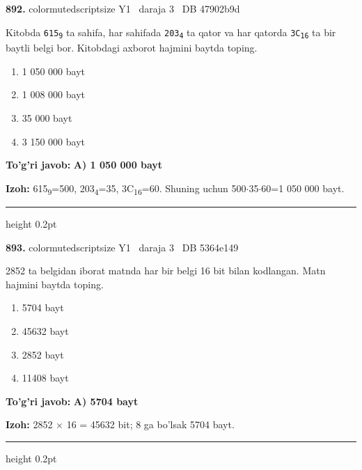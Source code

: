 \documentclass[10pt,a4paper,oneside]{article}
\begin{document}
\noindent\textbf{\color{ink}892.}  {color{muted}scriptsize Y1 \textbullet\ daraja 3 \textbullet\ DB 47902b9d}
\par
Kitobda \texttt{615\textsubscript{9}} ta sahifa, har sahifada \texttt{203\textsubscript{4}} ta qator va har qatorda \texttt{3C\textsubscript{1}\textsubscript{6}} ta bir baytli belgi bor. Kitobdagi axborot hajmini baytda toping.
\begin{enumerate}[label=\Alph*),leftmargin=9mm]
\item 1 050 000 bayt
\item 1 008 000 bayt
\item 35 000 bayt
\item 3 150 000 bayt
\end{enumerate}
\begin{tcolorbox}[enhanced,breakable,colback=teal!4,colframe=teal!50!black,boxrule=0.5pt,arc=1.1mm,left=3mm,right=3mm,top=1.7mm,bottom=1.7mm,before skip=2mm,after skip=2mm]
\textbf{\color{teal}To'g'ri javob:} \textbf{A) 1 050 000 bayt}
\par\smallskip
\textbf{Izoh:} 615\textsubscript{9}=500, 203\textsubscript{4}=35, 3C\textsubscript{1}\textsubscript{6}=60. Shuning uchun 500\ensuremath{\cdot}35\ensuremath{\cdot}60=1 050 000 bayt.
\end{tcolorbox}
\vspace{2mm}\hrule height 0.2pt \vspace{3mm}

\noindent\textbf{\color{ink}893.}  {color{muted}scriptsize Y1 \textbullet\ daraja 3 \textbullet\ DB 5364e149}
\par
2852 ta belgidan iborat matnda har bir belgi 16 bit bilan kodlangan. Matn hajmini baytda toping.
\begin{enumerate}[label=\Alph*),leftmargin=9mm]
\item 5704 bayt
\item 45632 bayt
\item 2852 bayt
\item 11408 bayt
\end{enumerate}
\begin{tcolorbox}[enhanced,breakable,colback=teal!4,colframe=teal!50!black,boxrule=0.5pt,arc=1.1mm,left=3mm,right=3mm,top=1.7mm,bottom=1.7mm,before skip=2mm,after skip=2mm]
\textbf{\color{teal}To'g'ri javob:} \textbf{A) 5704 bayt}
\par\smallskip
\textbf{Izoh:} 2852 \ensuremath{\times} 16 = 45632 bit; 8 ga bo'lsak 5704 bayt.
\end{tcolorbox}
\vspace{2mm}\hrule height 0.2pt \vspace{3mm}
\end{document}
